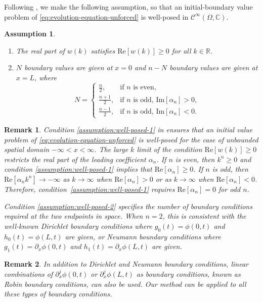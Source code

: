 \documentclass[journal,twoside,web]{ieeecolor}
\newtheorem{assumption}{Assumption}
\newtheorem{remark}{Remark}
\newcommand{\RR}{\mathbb{R}}
\newcommand{\CC}{\mathbb{C}}
\newcommand{\state}{\phi}
\begin{document}
Following \cite{fokas2008unified}, we make the following assumption, so that an initial-boundary value problem of \eqref{eq:evolution-equation-unforced} is well-posed in $\mathcal{C}^\infty(\Omega,\CC)$.
\begin{assumption}\label{assumption:well-posed}
	\begin{enumerate}
		\item The real part of $w(k)$ satisfies $\text{Re}[w(k)]\geq0$ for all $k\in\RR$. \label{assumption:well-posed-1}
	\item	\label{assumption:well-posed-2}
	$N$ boundary values are given at $x=0$ and $n-N$ boundary values are given at $x=L$, where
	\begin{equation*}
		N=\begin{cases}
			\frac{n}{2}, & \text{if } n \text{ is even},\\
			\frac{n+1}{2}, & \text{if } n \text{ is odd, }\text{Im}[\alpha_n] >0, \\
			\frac{n-1}{2}, & \text{if } n \text{ is odd, }\text{Im}[\alpha_n] <0.
		\end{cases}
	\end{equation*}
\end{enumerate}
\end{assumption}
\begin{remark}
	Condition \ref{assumption:well-posed-1} in  ensures that an initial value problem of \eqref{eq:evolution-equation-unforced} is well-posed for the case of unbounded spatial domain $-\infty<x<\infty$.
	The large $k$ limit of the condition $\text{Re}[w(k)]\geq0$ restricts the real part of the leading coefficient $\alpha_n$.
	If $n$ is even, then $k^n\geq0$ and condition \ref{assumption:well-posed-1} implies that $\text{Re}[\alpha_n]\geq0$.
	If $n$ is odd, then $\text{Re}[\alpha_n k^n]\to -\infty$ as $k\to \infty$ when $\text{Re}[\alpha_n]>0$ or as $k\to \infty$ when $\text{Re}[\alpha_n]<0$. 
	Therefore, condition~\ref{assumption:well-posed-1} requires $\text{Re}[\alpha_n]=0$ for odd $n$.

	Condition \ref{assumption:well-posed-2} specifies the number of boundary conditions required at the two endpoints in space.
	When $n=2$, this is consistent with the well-known Dirichlet boundary conditions where $g_0(t)=\state(0,t)$ and $h_0(t)=\state(L,t)$ are given, or Neumann boundary conditions where $g_1(t)=\partial_x\state(0,t)$ and $h_1(t)=\partial_x\state(L,t)$ are given.
\end{remark}
\begin{remark}
	In addition to Dirichlet and Neumann boundary conditions, linear combinations of $\partial_x^j\state(0,t)$ or $\partial_x^j\state(L,t)$ as boundary conditions, known as Robin boundary conditions, can also be used.
	Our method can be applied to all these types of boundary conditions.
\end{remark} 
\end{document}
